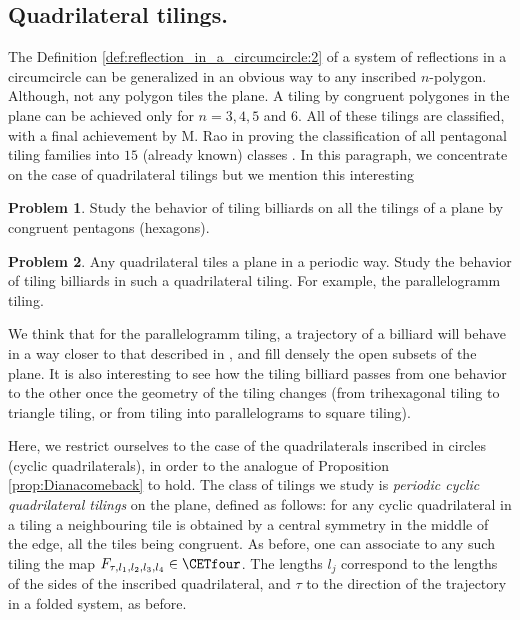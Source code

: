 \documentclass[12pt]{article}
\theoremstyle{definition}
\newtheorem*{problem}{Problem}
\begin{document}
\subsection{Quadrilateral tilings.}\label{sec:polygonal_tilings}
The Definition \ref{def:reflection_in_a_circumcircle:2} of a system of reflections in a circumcircle can be generalized in an obvious way to any inscribed $n$-polygon. Although, not any polygon tiles the plane.
A tiling by congruent polygones in the plane can be achieved only for $n=3,4,5$ and $6$. All of these tilings are classified, with a final achievement by M. Rao in proving the classification of all pentagonal tiling families into $15$ (already known) classes \cite{R17}. In this paragraph, we concentrate on the case of quadrilateral tilings but we mention this interesting

\begin{problem}
Study the behavior of tiling billiards on all the tilings of a plane by congruent pentagons (hexagons).
\end{problem}

\begin{problem}
Any quadrilateral tiles a plane in a periodic way. Study the behavior of tiling billiards in such a quadrilateral tiling. For example, the parallelogramm tiling.
\end{problem}

We think that for the parallelogramm tiling, a trajectory of a billiard will behave in a way closer to that described in \cite{DH18}, and fill densely the open subsets of the plane. It is also interesting to see how the tiling billiard passes from one behavior to the other once the geometry of the tiling changes (from trihexagonal tiling to triangle tiling, or from tiling into parallelograms to square tiling).

Here, we restrict ourselves to the case of the quadrilaterals inscribed in circles (cyclic quadrilaterals), in order to the analogue of Proposition \ref{prop:Dianacomeback} to hold. The class of tilings we study is \emph{periodic cyclic quadrilateral tilings } on the plane, defined as follows:  for any cyclic quadrilateral in a tiling a neighbouring tile is obtained by a central symmetry in the middle of the edge, all the tiles being congruent. As before, one can associate to any such tiling the map $F_{\tau, l_1, l_2, l_3, l_4} \in \CETfour$. The lengths $l_j$ correspond to the lengths of the sides of the inscribed quadrilateral, and $\tau$ to the direction of the trajectory in a folded system, as before.
\end{document}
